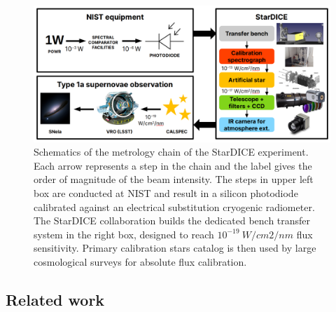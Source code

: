 \documentclass[amt, article]{copernicus}
\begin{document}
\begin{figure}[t]
	\includegraphics[width=\hsize]{figures/schematics_stardice.png}
	\caption{Schematics of the metrology chain of the StarDICE experiment. Each arrow represents a step in the chain and the label gives the order of magnitude of the beam intensity. The steps in upper left box are conducted at NIST \citep{Larason2008} and result in a silicon photodiode calibrated against an electrical substitution cryogenic radiometer. The StarDICE collaboration builds the dedicated bench transfer system in the right box, designed to reach $10^{-19} \: W/cm2/nm$ flux sensitivity. Primary calibration stars catalog is then used by large cosmological surveys for absolute flux calibration.}
    \label{fig:schematics_stardice}
\end{figure}

\subsection{Related work}
\end{document}
